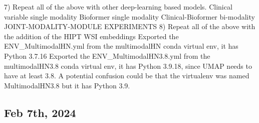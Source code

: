 \documentclass{article}%
\begin{document}
%
7) Repeat all of the above with other deep{-}learning based models. %
\newline%
\newline%
%
Clinical variable single modality %
\newline%
\newline%
%
Bioformer single modality %
\newline%
\newline%
%
Clinical{-}Bioformer bi{-}modality %
\newline%
\newline%
%
JOINT{-}MODALITY{-}MODULE EXPERIMENTS %
\newline%
\newline%
%
8) Repeat all of the above with the addition of the HIPT WSI embeddings  %
\newline%
\newline%
%
%
\newline%
\newline%
%
Exported the ENV\_MultimodalHN.yml from the multimodalHN conda virtual env, it has Python 3.7.16%
\newline%
\newline%
%
Exported the ENV\_MultimodalHN3.8.yml from the multimodalHN3.8 conda virtual env, it has Python 3.9.18, since UMAP needs to have at least 3.8. A potential confusion could be that the virtualenv was named MultimodalHN3.8 but it has Python 3.9. %
\newline%
\newline%
%
\subsection{Feb 7th, 2024 }%
\label{subsec:Feb7th,2024}%
\end{document}
